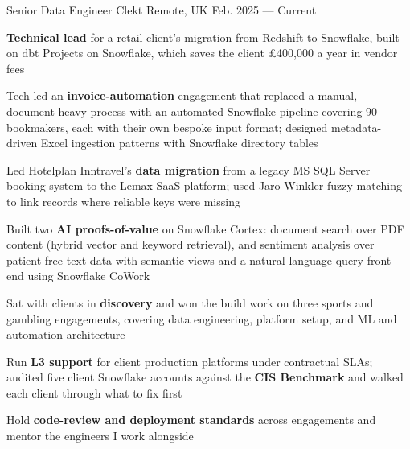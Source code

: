 
\begin{cventries}

  \cventry
  {Senior Data Engineer} %
  {Clekt } %
  {Remote, UK} %
  {Feb. 2025 --- Current} %
  {
    \begin{cvitems} %
    \item {\textbf{Technical lead} for a retail client's migration from Redshift to Snowflake, built on dbt Projects on Snowflake, which saves the client \pounds 400,000 a year in vendor fees}
    \item {Tech-led an \textbf{invoice-automation} engagement that replaced a manual, document-heavy process with an automated Snowflake pipeline covering 90 bookmakers, each with their own bespoke input format; designed metadata-driven Excel ingestion patterns with Snowflake directory tables}
    \item {Led Hotelplan Inntravel's \textbf{data migration} from a legacy MS SQL Server booking system to the Lemax SaaS platform; used Jaro-Winkler fuzzy matching to link records where reliable keys were missing}
    \item {Built two \textbf{AI proofs-of-value} on Snowflake Cortex: document search over PDF content (hybrid vector and keyword retrieval), and sentiment analysis over patient free-text data with semantic views and a natural-language query front end using Snowflake CoWork}
    \item {Sat with clients in \textbf{discovery} and won the build work on three sports and gambling engagements, covering data engineering, platform setup, and ML and automation architecture}
    \item {Run \textbf{L3 support} for client production platforms under contractual SLAs; audited five client Snowflake accounts against the \textbf{CIS Benchmark} and walked each client through what to fix first}
    \item {Hold \textbf{code-review and deployment standards} across engagements and mentor the engineers I work alongside}
    \end{cvitems}
  }


\end{cventries}

